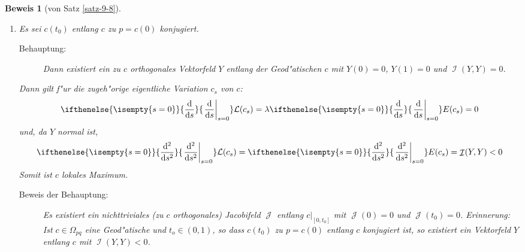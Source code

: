 \documentclass[paper=A4, twoside, chapterprefix=true, bibliography=totoc, headsepline]{scrbook}
\let\temp\phi
\let\phi\varphi
\let\varphi\temp
\let\temp\theta
\let\theta\vartheta
\let\vartheta\temp
\let\temp\epsilon
\let\epsilon\varepsilon
\let\varepsilon\temp
\let\temp\rho
\let\rho\varrho
\let\varrho\temp
\DeclareMathOperator{\calI}{\mathcal{I}}
\DeclareMathOperator{\calJ}{\mathcal{J}}
\newcommand{\dop}{\mathrm{d}}
\newcommand{\X}{\times}
\newcommand{\difffrac}[3][]{\ifthenelse{\isempty{#1}}{\frac{\dop #2}{\dop #3}}{\left. \frac{\dop #2}{\dop #3} \right|_{#1}}}
\theoremstyle{plain}
\theoremstyle{nonumberplain}
\newtheorem{bew}{Beweis}
\theoremstyle{empty}
\theoremstyle{break}
\begin{document}
\begin{bew}[von Satz \ref{satz-9-8}]
\begin{enumerate}[label=(\roman*),leftmargin=*,widest=ii]
\begin{center}
\end{center}
    Es sei $t_i$ eine Partition von $[0,1]$, so dass $\phi([t_{i-1},t_i]) \subseteq W_i$. Ist $c_s$ eine Variation von $c$, so kann $\epsilon > 0$ so gew"ahlt werden, dass
    \begin{align*}
      c_s \colon [t_{i-1},t_i]\X(-\epsilon,\epsilon) \to U_i = \exp_p(W_i)
    \end{align*}
    gilt. Dies definiert eine Variation $\psi_s$ von $\phi$ wie folgt:
    Ist $\psi_s$ bis $t_{i-1}$ definiert und gilt $\psi_s(t_{i-1}) \in W_i$, so setzt man $\psi_s(t) = \exp_p|_{W_i}^{-1}(c_s(t))$.
    Nach Lemma \ref{thm:lemma-9-10} gilt also
    \begin{align*}
      \mathcal L(\exp_p\circ \psi_s) = \mathcal L(c_s) \geq \mathcal L(c)
    \end{align*}
    f"ur alle $s$. Mit der Cauchy-Schwarz Ungleichung folgt dann:
    \begin{align*}
      E(c_s) \geq \frac{1}{2} \mathcal L(c_s)^2 \geq \frac{1}{2} \mathcal
      L(c)^2 = E(c)
    \end{align*}
  \item
    Es sei $c(t_0)$ entlang $c$ zu $p = c(0)$ konjugiert.
    
    \begin{description}\item[Behauptung:] Dann existiert ein zu $c$ orthogonales Vektorfeld $Y$ entlang der Geod"atischen $c$ mit $Y(0) = 0$, $Y(1) = 0$ und $\calI(Y,Y) = 0$.\end{description}
    Dann gilt f"ur die zugeh"orige eigentliche Variation $c_s$ von $c$:
    \begin{align*}
      \difffrac[s=0]{}{s}\mathcal L(c_s) = \lambda
      \difffrac[s=0]{}{s}E(c_s) = 0
    \end{align*}
    und, da $Y$ normal ist,
    \begin{align*}
      \difffrac[s=0]{^2}{s^2}\mathcal L(c_s) = \difffrac[s=0]{^2}{s^2}
      E(c_s) = \calI(Y,Y) < 0
    \end{align*}
    Somit ist $c$ lokales Maximum.
    \begin{description}\item[Beweis der Behauptung:]
      Es existiert ein nichttriviales (zu $c$ orthogonales) Jacobifeld $\calJ$ entlang $c|_{[0,t_0]}$ mit $\calJ(0) = 0$ und $\calJ(t_0) = 0$.
      \emph{Erinnerung:} Ist $c \in \Omega_{pq}$ eine Geod"atische und $t_o \in (0,1)$, so dass $c(t_0)$ zu $p = c(0)$ entlang $c$ konjugiert ist, so existiert ein Vektorfeld $Y$ entlang $c$ mit $\calI(Y,Y) < 0$.


\end{description}
\end{enumerate}
\end{bew}
\end{document}
